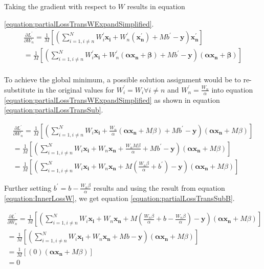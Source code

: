 \documentclass[a4paper,12pt]{article}
\begin{document}
Taking the gradient with respect to $W$ results in  equation

\ref{equation:partialLossTransWExpandSimplified}. 
\begin{equation}
\label{equation:partialLossTransWExpandSimplified}
\begin{split}
\frac{\partial L^{'}}{\partial W_{n}} = 
\frac{1}{M} \left[(\sum_{i = 1, i  \neq n}^{N}W_{i}^{'}\mathbf{x_{i}} + W_{n}^{'}(\mathbf{x_{n}^{'}}) + Mb^{'} - \mathbf{y})\mathbf{x_{n}^{'}}\right] \\
=
\frac{1}{M} \left[(\sum_{i = 1, i  \neq n}^{N}W_{i}^{'}\mathbf{x_{i}} + W_{n}^{'}(\mathbf{\alpha x_{n} + \beta}) + Mb^{'} - \mathbf{y})(\mathbf{\alpha x_{n} + \beta}) \right] \\
\end{split}
\end{equation}

To achieve the global minimum, a possible solution assignment would be to re-substitute in the original values for $W_{i}^{'} = W_{i} \forall i \neq n$ and  $W_{n}^{'} = \frac{W_{n}}{\alpha}$ into equation \ref{equation:partialLossTransWExpandSimplified} as shown in equation \ref{equation:partialLossTransSub}. 

\begin{equation}
\label{equation:partialLossTransSub}
\begin{split}
\frac{\partial L^{'}}{\partial W_{n}} = \frac{1}{M} \left[(\sum_{i = 1, i  \neq n}^{N}W_{i}\mathbf{x_{i}} + \frac{W_{n}}{\alpha}(\mathbf{\alpha x_{n}} + M\beta) + Mb^{'} - \mathbf{y})(\mathbf{\alpha x_{n}} + M \beta) \right] \\
= 
\frac{1}{M} \left[(\sum_{i = 1, i  \neq n}^{N}W_{i}\mathbf{x_{i}} + W_{n}\mathbf{x_{n}} + \frac{W_{n} M \beta}{\alpha} + Mb^{'} - \mathbf{y})(\mathbf{\alpha x_{n}} + M \beta) \right] \\
=
\frac{1}{M} \left[(\sum_{i = 1, i \neq n}^{N}W_{i}\mathbf{x_{i}} + W_{n}\mathbf{x_{n}} + M (\frac{W_{n} \beta}{\alpha} + b^{'}) - \mathbf{y})(\mathbf{\alpha x_{n}} + M \beta) \right] 
\end{split}
\end{equation}

Further setting $b^{'} = b - \frac{W_{n} \beta}{\alpha}$ results  and using the result from equation \ref{equation:InnerLossW}, we get equation \ref{equation:partialLossTransSubB}.

\begin{equation}
\label{equation:partialLossTransSubB}
\begin{split}
\frac{\partial L^{'}}{\partial W_{n}} = \frac{1}{M} \left[(\sum_{i = 1, i \neq n}^{N}W_{i}\mathbf{x_{i}} + W_{n}\mathbf{x_{n}} + M (\frac{W_{n} \beta}{\alpha} + b - \frac{W_{n} \beta}{\alpha} ) - \mathbf{y})(\mathbf{\alpha x_{n}} + M \beta) \right] \\
= 
\frac{1}{M} \left[(\sum_{i = 1, i \neq n}^{N}W_{i}\mathbf{x_{i}} + W_{n}\mathbf{x_{n}} + Mb - \mathbf{y})(\mathbf{\alpha x_{n}} + M \beta) \right] \\
=
\frac{1}{M} \left[(0)(\mathbf{\alpha x_{n}} + M \beta) \right] \\ 
= 0
\end{split}
\end{equation}
\end{document}

